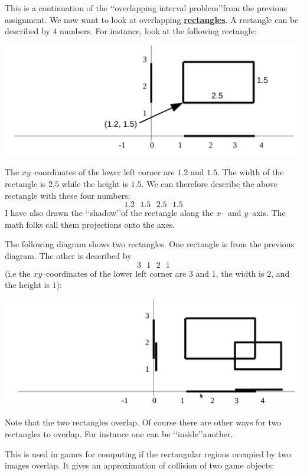 This is a continuation of the \lq\lq overlapping interval problem\rq\rq from 
the previous assignment. We now want to look at overlapping
{\bf \underline{rectangles}}. A rectangle can be described by $4$ numbers.
For instance, look at the following rectangle:

\includegraphics[width=6 in, height=2 in]{figure1.png}

The $xy$--coordinates of the lower left corner are $1.2$ and $1.5$. The width 
of the rectangle is $2.5$ while the height is $1.5$. We can therefore describe
the above rectangle with these four numbers:
\[ 1.2 \,\,\,\, 1.5 \,\,\,\, 2.5 \,\,\,\, 1.5 \]
I have also drawn the \lq\lq shadow\rq\rq of the rectangle along the $x$-- and
$y$--axis. The math folks call them projections onto the axes.

The following diagram shows two rectangles. One rectangle is from the previous 
diagram. The other is described by
\[ 3 \,\,\,\, 1 \,\,\,\, 2 \,\,\,\, 1 \]
(i.e the $xy$--coordinates 
of the lower left corner are $3$ and $1$, the width is $2$, 
and the height is $1$):

\includegraphics[width=6 in, height=2 in]{figure2.png}

Note that the two rectangles overlap. Of course there are other ways for two 
rectangles to overlap. For instance one can be \lq\lq inside\rq\rq another.

This is used in games for computing if the rectangular regions occupied by two 
images overlap. It gives an approximation of collision of two game objects:


